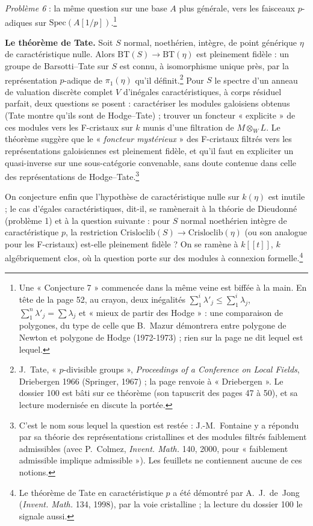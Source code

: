 \documentclass[11pt,a4paper]{article}
\begin{document}
\emph{Problème 6} : la même question sur une base $A$ plus générale, vers les
faisceaux $p$-adiques sur $\mathrm{Spec}(A[1/p])$.\footnote{Une « Conjecture 7 »
commencée dans la même veine est biffée à la main. En tête de la page 52, au
crayon, deux inégalités $\sum_1^i \lambda'_j \leq \sum_1^i \lambda_j$,
$\sum_1^n \lambda'_j = \sum \lambda_j$ et « mieux de partir des Hodge » :
une comparaison de polygones, du type de celle que B.~Mazur démontrera entre
polygone de Newton et polygone de Hodge (1972-1973) ; rien sur la page ne dit
lequel est lequel.}

\textbf{Le théorème de Tate.} Soit $S$ normal, noethérien, intègre, de point
générique $\eta$ de caractéristique nulle. Alors $\mathrm{BT}(S) \to
\mathrm{BT}(\eta)$ est pleinement fidèle : un groupe de Barsotti--Tate sur
$S$ est connu, à isomorphisme unique près, par la représentation
$p$-adique de $\pi_1(\eta)$ qu'il définit.\footnote{J.~Tate, « $p$-divisible
groups », \emph{Proceedings of a Conference on Local Fields}, Driebergen
1966 (Springer, 1967) ; la page renvoie à « Driebergen ». Le dossier 100 est
bâti sur ce théorème (son tapuscrit des pages 47 à 50), et sa lecture
modernisée en discute la portée.} Pour $S$ le spectre d'un anneau de
valuation discrète complet $V$ d'inégales caractéristiques, à corps
résiduel parfait, deux questions se posent : caractériser les modules
galoisiens obtenus (Tate montre qu'ils sont de Hodge--Tate) ; trouver un
foncteur « explicite » de ces modules vers les F-cristaux sur $k$ munis d'une
filtration de $M \otimes_W L$. Le théorème suggère que le « \emph{foncteur
mystérieux} » des F-cristaux filtrés vers les représentations galoisiennes
est pleinement fidèle, et qu'il faut en expliciter un quasi-inverse sur une
sous-catégorie convenable, sans doute contenue dans celle des
représentations de Hodge--Tate.\footnote{C'est le nom sous lequel la question
est restée : J.-M.~Fontaine y a répondu par sa théorie des représentations
cristallines et des modules filtrés faiblement admissibles (avec
P.~Colmez, \emph{Invent. Math.} 140, 2000, pour « faiblement admissible
implique admissible »). Les feuillets ne contiennent aucune de ces notions.}

On conjecture enfin que l'hypothèse de caractéristique nulle sur $k(\eta)$ est
inutile ; le cas d'égales caractéristiques, dit-il, se ramènerait à la théorie
de Dieudonné (problème 1) et à la question suivante : pour $S$ normal
noethérien intègre de caractéristique $p$, la restriction
$\mathrm{Crisloclib}(S) \to \mathrm{Crisloclib}(\eta)$ (ou son analogue pour les
F-cristaux) est-elle pleinement fidèle ? On se ramène à $k[[t]]$, $k$
algébriquement clos, où la question porte sur des modules à connexion
formelle.\footnote{Le théorème de Tate en caractéristique $p$ a été démontré
par A.~J.~de~Jong (\emph{Invent. Math.} 134, 1998), par la voie cristalline ;
la lecture du dossier 100 le signale aussi.}
\end{document}
